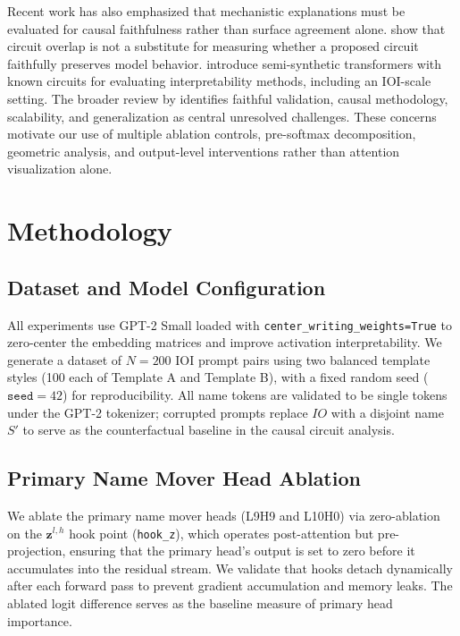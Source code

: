 \documentclass[10pt]{article} %
\begin{document}
Recent work has also emphasized that mechanistic explanations must be
evaluated for causal faithfulness rather than surface agreement alone.
\citet{hanna2024faithfulness} show that circuit overlap is not a substitute
for measuring whether a proposed circuit faithfully preserves model behavior.
\citet{gupta2024interpbench} introduce semi-synthetic transformers with known
circuits for evaluating interpretability methods, including an IOI-scale
setting. The broader review by \citet{sharkey2025openproblems} identifies
faithful validation, causal methodology, scalability, and generalization as
central unresolved challenges. These concerns motivate our use of multiple
ablation controls, pre-softmax decomposition, geometric analysis, and
output-level interventions rather than attention visualization alone.

\section{Methodology}
\label{sec:method}

\subsection{Dataset and Model Configuration}
\label{subsec:dataset}

All experiments use GPT-2 Small loaded with \texttt{center\_writing\_weights=True}
to zero-center the embedding matrices and improve activation interpretability.
We generate a dataset of $N=200$ IOI prompt pairs using two balanced template
styles (100 each of Template A and Template B), with a fixed random seed
($\texttt{seed}=42$) for reproducibility. All name tokens are validated to be
single tokens under the GPT-2 tokenizer; corrupted prompts replace $IO$ with
a disjoint name $S'$ to serve as the counterfactual baseline in the causal
circuit analysis.

\subsection{Primary Name Mover Head Ablation}
\label{subsec:ablation}

We ablate the primary name mover heads (L9H9 and L10H0) via zero-ablation on
the $\mathbf{z}^{l,h}$ hook point (\texttt{hook\_z}), which operates post-attention
but pre-projection, ensuring that the primary head's output is set to zero before
it accumulates into the residual stream. We validate that hooks detach
dynamically after each forward pass to prevent gradient accumulation and memory
leaks. The ablated logit difference serves as the baseline measure of primary
head importance.
\end{document}
